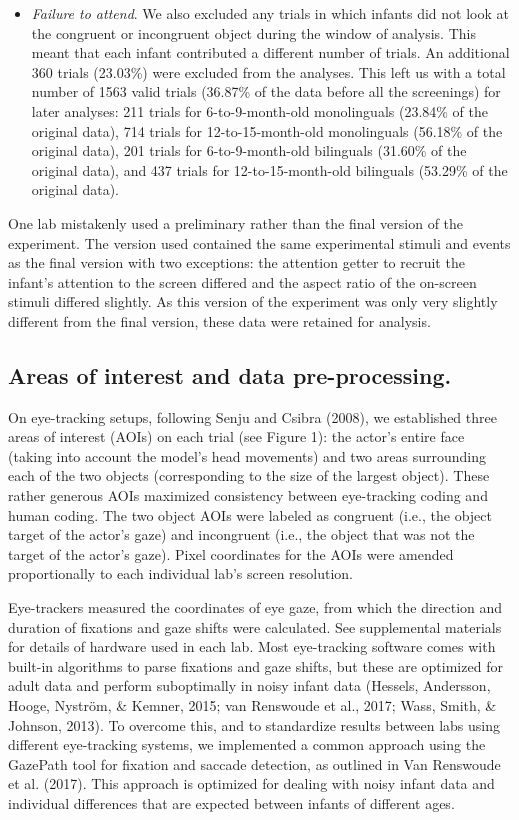 \documentclass[,man,floatsintext]{apa6}
\begin{document}
\begin{itemize}
\item
  \emph{Failure to attend}. We also excluded any trials in which infants did not look at the congruent or incongruent object during the window of analysis. This meant that each infant contributed a different number of trials. An additional 360 trials (23.03\%) were excluded from the analyses. This left us with a total number of 1563 valid trials (36.87\% of the data before all the screenings) for later analyses: 211 trials for 6-to-9-month-old monolinguals (23.84\% of the original data), 714 trials for 12-to-15-month-old monolinguals (56.18\% of the original data), 201 trials for 6-to-9-month-old bilinguals (31.60\% of the original data), and 437 trials for 12-to-15-month-old bilinguals (53.29\% of the original data).
\end{itemize}

One lab mistakenly used a preliminary rather than the final version of the experiment. The version used contained the same experimental stimuli and events as the final version with two exceptions: the attention getter to recruit the infant's attention to the screen differed and the aspect ratio of the on-screen stimuli differed slightly. As this version of the experiment was only very slightly different from the final version, these data were retained for analysis.

\hypertarget{areas-of-interest-and-data-pre-processing.}{%
\subsection{Areas of interest and data pre-processing.}\label{areas-of-interest-and-data-pre-processing.}}

On eye-tracking setups, following Senju and Csibra (2008), we established three areas of interest (AOIs) on each trial (see Figure 1): the actor's entire face (taking into account the model's head movements) and two areas surrounding each of the two objects (corresponding to the size of the largest object). These rather generous AOIs maximized consistency between eye-tracking coding and human coding. The two object AOIs were labeled as congruent (i.e., the object target of the actor's gaze) and incongruent (i.e., the object that was not the target of the actor's gaze). Pixel coordinates for the AOIs were amended proportionally to each individual lab's screen resolution.

Eye-trackers measured the coordinates of eye gaze, from which the direction and duration of fixations and gaze shifts were calculated. See supplemental materials for details of hardware used in each lab. Most eye-tracking software comes with built-in algorithms to parse fixations and gaze shifts, but these are optimized for adult data and perform suboptimally in noisy infant data (Hessels, Andersson, Hooge, Nyström, \& Kemner, 2015; van Renswoude et al., 2017; Wass, Smith, \& Johnson, 2013). To overcome this, and to standardize results between labs using different eye-tracking systems, we implemented a common approach using the GazePath tool for fixation and saccade detection, as outlined in Van Renswoude et al. (2017). This approach is optimized for dealing with noisy infant data and individual differences that are expected between infants of different ages.
\end{document}
